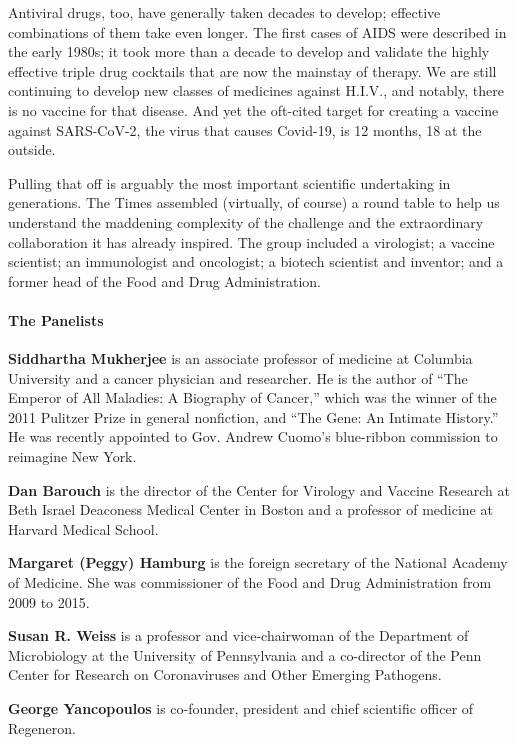 Antiviral drugs, too, have generally taken decades to develop; effective
combinations of them take even longer. The first cases of AIDS were
described in the early 1980s; it took more than a decade to develop and
validate the highly effective triple drug cocktails that are now the
mainstay of therapy. We are still continuing to develop new classes of
medicines against H.I.V., and notably, there is no vaccine for that
disease. And yet the oft-cited target for creating a vaccine against
SARS-CoV-2, the virus that causes Covid-19, is 12 months, 18 at the
outside.

Pulling that off is arguably the most important scientific undertaking
in generations. The Times assembled (virtually, of course) a round table
to help us understand the maddening complexity of the challenge and the
extraordinary collaboration it has already inspired. The group included
a virologist; a vaccine scientist; an immunologist and oncologist; a
biotech scientist and inventor; and a former head of the Food and Drug
Administration.

\hypertarget{the-panelists}{%
\paragraph{The Panelists}\label{the-panelists}}

\textbf{Siddhartha Mukherjee} is an associate professor of medicine at
Columbia University and a cancer physician and researcher. He is the
author of ``The Emperor of All Maladies: A Biography of Cancer,'' which
was the winner of the 2011 Pulitzer Prize in general nonfiction, and
``The Gene: An Intimate History.'' He was recently appointed to Gov.
Andrew Cuomo's blue-ribbon commission to reimagine New York.

\textbf{Dan Barouch} is the director of the Center for Virology and
Vaccine Research at Beth Israel Deaconess Medical Center in Boston and a
professor of medicine at Harvard Medical School.

\textbf{Margaret (Peggy) Hamburg} is the foreign secretary of the
National Academy of Medicine. She was commissioner of the Food and Drug
Administration from 2009 to 2015.

\textbf{Susan R. Weiss} is a professor and vice-chairwoman of the
Department of Microbiology at the University of Pennsylvania and a
co-director of the Penn Center for Research on Coronaviruses and Other
Emerging Pathogens.

\textbf{George Yancopoulos} is co-founder, president and chief
scientific officer of Regeneron.

